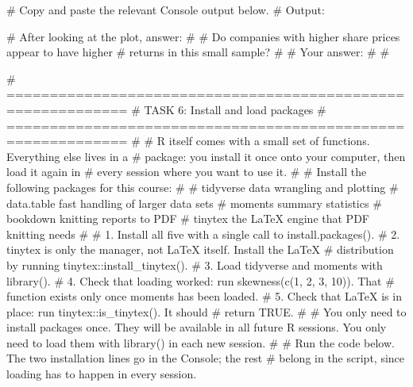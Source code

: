 \documentclass[
  12pt,
  a4paper,
]{scrbook}
\newenvironment{Shaded}{\begin{snugshade}}{\end{snugshade}}
\newcommand{\AlertTok}[1]{\textcolor[rgb]{0.68,0.00,0.00}{#1}}
\newcommand{\CommentTok}[1]{\textcolor[rgb]{0.37,0.37,0.37}{#1}}
\theoremstyle{plain}
\theoremstyle{definition}
\theoremstyle{remark}
\begin{document}
\begin{Shaded}
\begin{Highlighting}[]
\CommentTok{\# Copy and paste the relevant Console output below.}
\CommentTok{\# Output:}


\CommentTok{\# After looking at the plot, answer:}
\CommentTok{\#}
\CommentTok{\# Do companies with higher share prices appear to have higher}
\CommentTok{\# returns in this small sample?}
\CommentTok{\#}
\CommentTok{\# Your answer:}
\CommentTok{\#}
\CommentTok{\#}


\CommentTok{\# ============================================================}
\CommentTok{\# }\AlertTok{TASK}\CommentTok{ 6: Install and load packages}
\CommentTok{\# ============================================================}
\CommentTok{\#}
\CommentTok{\# R itself comes with a small set of functions. Everything else lives in a}
\CommentTok{\# package: you install it once onto your computer, then load it again in}
\CommentTok{\# every session where you want to use it.}
\CommentTok{\#}
\CommentTok{\# Install the following packages for this course:}
\CommentTok{\#}
\CommentTok{\#     tidyverse      data wrangling and plotting}
\CommentTok{\#     data.table     fast handling of larger data sets}
\CommentTok{\#     moments        summary statistics}
\CommentTok{\#     bookdown       knitting reports to PDF}
\CommentTok{\#     tinytex        the LaTeX engine that PDF knitting needs}
\CommentTok{\#}
\CommentTok{\# 1. Install all five with a single call to \textasciigrave{}install.packages()\textasciigrave{}.}
\CommentTok{\# 2. \textasciigrave{}tinytex\textasciigrave{} is only the manager, not LaTeX itself. Install the LaTeX}
\CommentTok{\#    distribution by running \textasciigrave{}tinytex::install\_tinytex()\textasciigrave{}.}
\CommentTok{\# 3. Load \textasciigrave{}tidyverse\textasciigrave{} and \textasciigrave{}moments\textasciigrave{} with \textasciigrave{}library()\textasciigrave{}.}
\CommentTok{\# 4. Check that loading worked: run \textasciigrave{}skewness(c(1, 2, 3, 10))\textasciigrave{}. That}
\CommentTok{\#    function exists only once \textasciigrave{}moments\textasciigrave{} has been loaded.}
\CommentTok{\# 5. Check that LaTeX is in place: run \textasciigrave{}tinytex::is\_tinytex()\textasciigrave{}. It should}
\CommentTok{\#    return TRUE.}
\CommentTok{\#}
\CommentTok{\# You only need to install packages once. They will be available in all future R sessions. You only need to load them with \textasciigrave{}library()\textasciigrave{} in each new session.}
\CommentTok{\#}
\CommentTok{\# Run the code below. The two installation lines go in the Console; the rest}
\CommentTok{\# belong in the script, since loading has to happen in every session.}


\end{Highlighting}
\end{Shaded}
\end{document}
